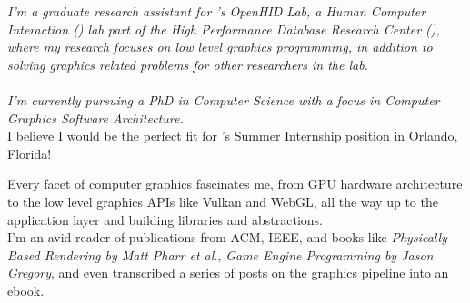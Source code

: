 \documentclass[10pt,a4paper]{article}
\begin{document}
\begin{multicols}{2}

\noindent{}

\vspace{-1.3em}


\noindent \textit{I'm a graduate research assistant for 's OpenHID Lab, a Human Computer Interaction () lab part of the High Performance Database Research Center (), where my research focuses on low level graphics programming, in addition to solving graphics related problems for other researchers in the lab. \\ \\ I'm currently pursuing a PhD in Computer Science with a focus in Computer Graphics Software Architecture.} \\

I believe I would be the perfect fit for 's Summer Internship position in Orlando, Florida!


Every facet of computer graphics fascinates me, from GPU hardware architecture to the low level graphics APIs like Vulkan and WebGL, all the way up to the application layer and building libraries and abstractions. \\

I'm an avid reader of publications from ACM, IEEE, and books like \textit{Physically Based Rendering by Matt Pharr et al.}, \textit{Game Engine Programming by Jason Gregory}, and even transcribed a series of posts on the graphics pipeline into an ebook. 


\end{multicols}
\end{document}
